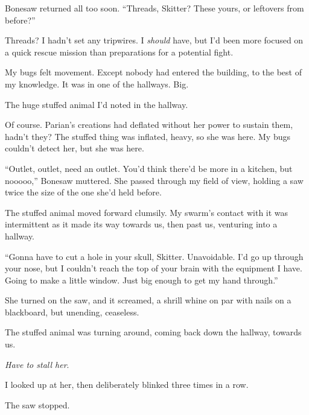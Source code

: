 Bonesaw returned all too soon.  ``Threads, Skitter?  These yours, or leftovers from before?''



Threads?  I hadn't set any tripwires.  I \emph{should} have, but I'd been more focused on a quick rescue mission than preparations for a potential fight.



My bugs felt movement.  Except nobody had entered the building, to the best of my knowledge.  It was in one of the hallways.  Big.



The huge stuffed animal I'd noted in the hallway.



Of course.  Parian's creations had deflated without her power to sustain them, hadn't they?  The stuffed thing was inflated, heavy, so she was here.  My bugs couldn't detect her, but she was here.



``Outlet, outlet, need an outlet.  You'd think there'd be more in a kitchen, but nooooo,'' Bonesaw muttered.  She passed through my field of view, holding a saw twice the size of the one she'd held before.



The stuffed animal moved forward clumsily.  My swarm's contact with it was intermittent as it made its way towards us, then past us, venturing into a hallway.



``Gonna have to cut a hole in your skull, Skitter.  Unavoidable.  I'd go up through your nose, but I couldn't reach the top of your brain with the equipment I have.  Going to make a little window.  Just big enough to get my hand through.''



She turned on the saw, and it screamed, a shrill whine on par with nails on a blackboard, but unending, ceaseless.



The stuffed animal was turning around, coming back down the hallway, towards us.



\emph{Have to stall her}.



I looked up at her, then deliberately blinked three times in a row.



The saw stopped.




